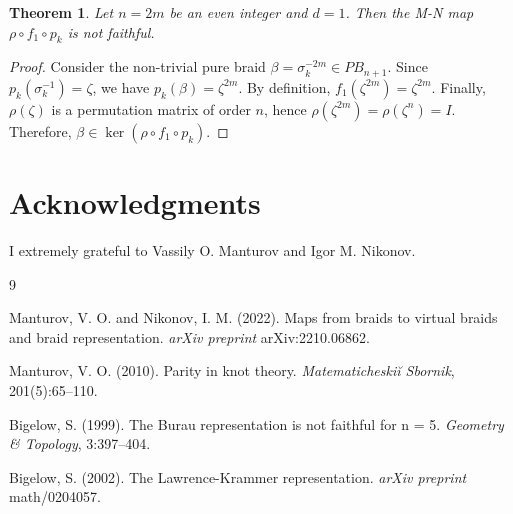 \documentclass{article}
\newtheorem{theorem}{Theorem}
\begin{document}
\begin{theorem}
Let $n = 2m$ be an even integer and $d = 1$. Then the M-N map $\rho \circ f_1 \circ p_k$ is not faithful.
\end{theorem}
\begin{proof}
Consider the non-trivial pure braid $\beta = \sigma_k^{-2m} \in PB_{n+1}$. Since $p_k(\sigma_k^{-1}) = \zeta$, we have $p_k(\beta) = \zeta^{2m}$. By definition, $f_1(\zeta^{2m}) = \zeta^{2m}$. Finally, $\rho(\zeta)$ is a permutation matrix of order $n$, hence $\rho(\zeta^{2m}) = \rho(\zeta^n) = I$. Therefore, $\beta \in \ker(\rho \circ f_1 \circ p_k)$.
\end{proof}

\section*{Acknowledgments}
I extremely grateful to Vassily O. Manturov and  Igor M. Nikonov.
        
\begin{thebibliography}{9}

 Manturov, V. O. and Nikonov, I. M. (2022). Maps from braids to virtual braids and braid representation. \textit{arXiv preprint} arXiv:2210.06862.

 Manturov, V. O. (2010). Parity in knot theory. \textit{Matematicheskiĭ Sbornik}, 201(5):65–110.

 Bigelow, S. (1999). The Burau representation is not faithful for n = 5. \textit{Geometry \& Topology}, 3:397–404.

 Bigelow, S. (2002). The Lawrence-Krammer representation. \textit{arXiv preprint} math/0204057.

\end{thebibliography}
\end{document}
